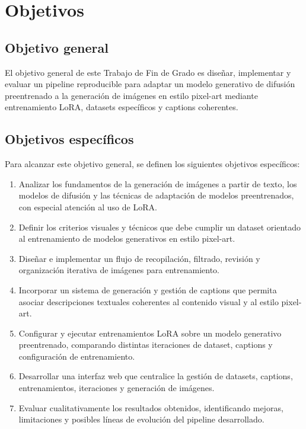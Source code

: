 \documentclass[a4paper,11pt,titlepage]{scrbook}
\begin{document}
\chapter{Objetivos} \label{objetivos}

\section{Objetivo general}

El objetivo general de este Trabajo de Fin de Grado es diseñar, implementar y evaluar un pipeline reproducible para adaptar un modelo generativo de difusión preentrenado a la generación de imágenes en estilo pixel-art mediante entrenamiento LoRA, datasets específicos y captions coherentes.

\section{Objetivos específicos}

Para alcanzar este objetivo general, se definen los siguientes objetivos específicos:

\begin{enumerate}
    \item Analizar los fundamentos de la generación de imágenes a partir de texto, los modelos de difusión y las técnicas de adaptación de modelos preentrenados, con especial atención al uso de LoRA.

    \item Definir los criterios visuales y técnicos que debe cumplir un dataset orientado al entrenamiento de modelos generativos en estilo pixel-art.

    \item Diseñar e implementar un flujo de recopilación, filtrado, revisión y organización iterativa de imágenes para entrenamiento.

    \item Incorporar un sistema de generación y gestión de captions que permita asociar descripciones textuales coherentes al contenido visual y al estilo pixel-art.

    \item Configurar y ejecutar entrenamientos LoRA sobre un modelo generativo preentrenado, comparando distintas iteraciones de dataset, captions y configuración de entrenamiento.

    \item Desarrollar una interfaz web que centralice la gestión de datasets, captions, entrenamientos, iteraciones y generación de imágenes.

    \item Evaluar cualitativamente los resultados obtenidos, identificando mejoras, limitaciones y posibles líneas de evolución del pipeline desarrollado.
\end{enumerate}
\end{document}
